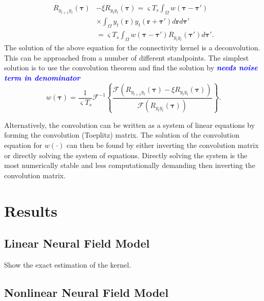 \documentclass[conference]{IEEEtran}
\newcommand{\parham}[1]{\textsf{\emph{\textbf{\textcolor{blue}{#1}}}}}
\begin{document}
\begin{align}
	R_{y_{t+1}y_t}(\boldsymbol{\tau}) &-\xi R_{y_ty_t}(\boldsymbol{\tau}) = \varsigma T_s \int_{\Omega} w(\boldsymbol{\tau}-\boldsymbol{\tau}') \nonumber \\
	&\times \int_{\Omega} y_t(\mathbf{r}) y_t(\mathbf{r}+\boldsymbol{\tau}') d\mathbf{r}d\boldsymbol{\tau}' \\
	&= \varsigma T_s \int_{\Omega} w(\boldsymbol{\tau}-\boldsymbol{\tau}') R_{y_ty_t}(\boldsymbol{\tau}')d\boldsymbol{\tau}'.
\end{align}
The solution of the above equation for the connectivity kernel is a deconvolution. This can be approached from a number of different standpoints. The simplest solution is to use the convolution theorem and find the solution by \parham{needs noise term in denominator}
\begin{equation}
	w(\boldsymbol{\tau}) = \frac{1}{\varsigma T_s}\mathcal{F}^{-1}\left\{\frac{\mathcal{F}\left(R_{y_{t+1}y_t}(\boldsymbol{\tau}) -\xi R_{y_ty_t}(\boldsymbol{\tau})\right)}{\mathcal{F}\left(R_{y_ty_t}(\boldsymbol{\tau})\right)}\right\}.
\end{equation}

Alternatively, the convolution can be written as a system of linear equations by forming the convolution (Toeplitz) matrix. The solution of the convolution equation for $w(\cdot)$ can then be found by either inverting the convolution matrix or directly solving the system of equations. Directly solving the system is the most numerically stable and less computationally demanding then inverting the convolution matrix. 



\section{Results}

\subsection{Linear Neural Field Model}
Show the exact estimation of the kernel.

\subsection{Nonlinear Neural Field Model}

\newpage
\end{document}
